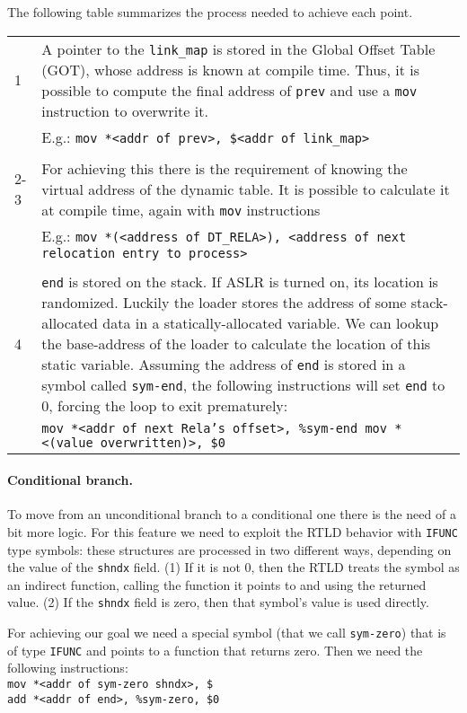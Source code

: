 \documentclass[11pt,twoside,a4paper]{article}
\begin{document}
The following table summarizes the process needed to achieve each point.

\begin{longtable}{ l | p{} }
  \hline
  1 & A pointer to the \texttt{link\_map} is stored in the Global Offset Table (GOT), whose address is known at compile time. Thus, it is possible to compute the final address of \texttt{prev} and use a \texttt{mov} instruction to overwrite it. \\ & E.g.: \texttt{mov *<addr of prev>, \$<addr of link\_map>} \\ \hline \\
  2-3 & For achieving this there is the requirement of knowing the virtual address of the dynamic table. It is possible to calculate it at compile time, again with \texttt{mov} instructions \\ & E.g.: \texttt{mov *(<address of DT\_RELA>), <address of next relocation entry to process>} \\ \hline \\
  4 & \texttt{end} is stored on the stack. If ASLR is turned on, its location is randomized. Luckily the loader stores the address of some stack-allocated data in a statically-allocated variable. We can lookup the base-address of the loader to calculate the location of this static variable. Assuming the
address of \texttt{end} is stored in a symbol called \texttt{sym-end}, the following instructions will set \texttt{end} to 0, forcing the loop to exit prematurely: \\
  & \texttt{mov *<addr of next Rela's offset>, \%sym-end mov *<(value overwritten)>, \$0} \\
  \hline
\end{longtable}

\paragraph{Conditional branch.} To move from an unconditional branch to a conditional one there is the need of a bit more logic. For this feature we need to exploit the RTLD behavior with \texttt{IFUNC} type symbols: these structures are processed in two different ways, depending on the value of the \texttt{shndx} field. (1) If it is not 0, then the RTLD treats the symbol as an indirect function, calling the function it points to and using the returned value. (2) If the \texttt{shndx} field is zero, then that symbol's value is used directly.

For achieving our goal we need a special symbol (that we call \texttt{sym-zero}) that is of type \texttt{IFUNC} and points to a function that returns zero. Then we need the following instructions:\\
\texttt{mov *<addr of sym-zero shndx>, \$<test val>} \\
\texttt{add *<addr of end>, \%sym-zero, \$0}
\end{document}
